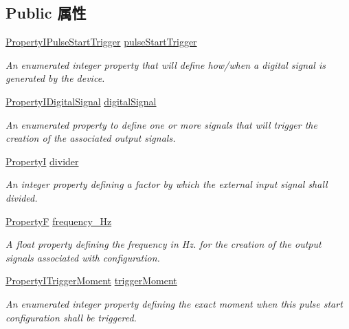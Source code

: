 \subsection*{Public 属性}
\begin{DoxyCompactItemize}
\item 
\hyperlink{group___device_specific_interface_gac582d13155205627b2f103a6d612c3df}{Property\+I\+Pulse\+Start\+Trigger} \hyperlink{classmv_i_m_p_a_c_t_1_1acquire_1_1_pulse_start_configuration_a0c71f34ee55702d9ef0902a3c49770cf}{pulse\+Start\+Trigger}
\begin{DoxyCompactList}\small\item\em An enumerated integer property that will define how/when a digital signal is generated by the device. \end{DoxyCompactList}\item 
\hyperlink{group___device_specific_interface_gacc6f7760bd2f88895f8d5d63ce364132}{Property\+I\+Digital\+Signal} \hyperlink{classmv_i_m_p_a_c_t_1_1acquire_1_1_pulse_start_configuration_a5cf89b1d644e0ba87fa1a254f7d2a0df}{digital\+Signal}
\begin{DoxyCompactList}\small\item\em An enumerated property to define one or more signals that will trigger the creation of the associated output signals. \end{DoxyCompactList}\item 
\hyperlink{group___common_interface_ga12d5e434238ca242a1ba4c6c3ea45780}{Property\+I} \hyperlink{classmv_i_m_p_a_c_t_1_1acquire_1_1_pulse_start_configuration_a1ad8c61475fe5a921306c8361ca01736}{divider}
\begin{DoxyCompactList}\small\item\em An integer property defining a factor by which the external input signal shall divided. \end{DoxyCompactList}\item 
\hyperlink{group___common_interface_gaf54865fe5a3d5cfd15f9a111b40d09f9}{Property\+F} \hyperlink{classmv_i_m_p_a_c_t_1_1acquire_1_1_pulse_start_configuration_a7e844230a702212a0c0927eb7adecef6}{frequency\+\_\+\+Hz}
\begin{DoxyCompactList}\small\item\em A float property defining the frequency in Hz. for the creation of the output signals associated with configuration. \end{DoxyCompactList}\item 
\hyperlink{group___device_specific_interface_gaa261dc5ec8f6c2053d6e5a1485ac101d}{Property\+I\+Trigger\+Moment} \hyperlink{classmv_i_m_p_a_c_t_1_1acquire_1_1_pulse_start_configuration_ae8ac8d12618f23cbb2e0fa73d011373d}{trigger\+Moment}
\begin{DoxyCompactList}\small\item\em An enumerated integer property defining the exact moment when this pulse start configuration shall be triggered. \end{DoxyCompactList}\end{DoxyCompactItemize}

